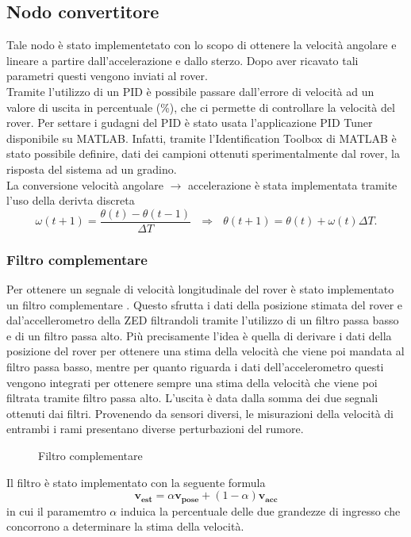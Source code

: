 \subsection{Nodo convertitore}
Tale nodo è stato implementetato con lo scopo di ottenere la velocità angolare e lineare a partire dall'accelerazione e dallo sterzo. Dopo aver ricavato tali parametri questi vengono inviati al rover.\\
Tramite l'utilizzo di un PID è possibile passare dall'errore di velocità ad un valore di uscita in percentuale (\%), che ci permette di controllare la velocità del rover. Per settare i gudagni del PID è stato usata l'applicazione PID Tuner disponibile su MATLAB. Infatti, tramite l'Identification Toolbox di MATLAB è stato possibile definire, dati dei campioni ottenuti sperimentalmente dal rover, la risposta del sistema ad un gradino.\\ La conversione velocità angolare $\rightarrow$ accelerazione è stata implementata tramite l'uso della derivta discreta
\begin{equation}
\omega(t+1)=\frac{\theta(t)-\theta(t-1)}{\Delta{T}} \ \ \
\Rightarrow \ \ \ \theta(t+1)=\theta(t)+\omega(t)\Delta{T}.
\end{equation} 

\subsubsection{Filtro complementare}
Per ottenere un segnale di velocità longitudinale del rover è stato implementato un filtro complementare \cite{Filtrocompelmentare}. Questo sfrutta i dati della posizione stimata del rover e dal'accellerometro della ZED filtrandoli tramite l'utilizzo di un filtro passa basso e di un filtro passa alto. Più precisamente l'idea è quella di derivare i dati della posizione del rover per ottenere una stima della velocità che viene poi mandata al filtro passa basso, mentre per quanto riguarda i dati dell'accelerometro questi vengono integrati per ottenere sempre una stima della velocità che viene poi filtrata tramite filtro passa alto.
L'uscita è data dalla somma dei due segnali ottenuti dai filtri.
Provenendo da sensori diversi, le misurazioni della velocità di entrambi i rami presentano diverse perturbazioni del rumore.
\begin{figure} [H]
    \centering
    
    \caption{Filtro complementare}
    \label{fig:Filtro complementare}
\end{figure} 
\noindent
Il filtro è stato implementato con la seguente formula
\begin{equation}
\boldsymbol{v_{est}}=\alpha \boldsymbol{v_{pose}}+(1-\alpha) \boldsymbol{v_{acc}}
\end{equation} 
in cui il paramemtro $\alpha$ induica la percentuale delle due grandezze di ingresso che concorrono a determinare la stima della velocità.